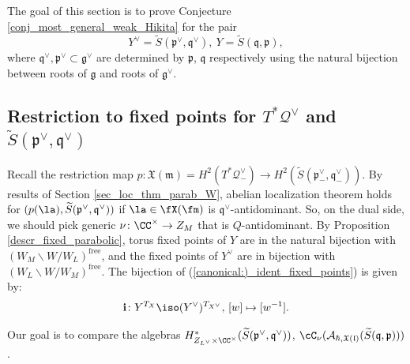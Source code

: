 \documentclass[12pt]{amsart}
\begin{document}
The goal of this section is to prove Conjecture \ref{conj_most_general_weak_Hikita} for the pair 
\begin{equation*}
Y^\vee=\widetilde{S}(\mathfrak{p}^\vee,\mathfrak{q}^\vee),~Y=\widetilde{S}(\mathfrak{q},\mathfrak{p}),
\end{equation*}
where $\mathfrak{q}^\vee, \mathfrak{p}^\vee \subset \mathfrak{g}^\vee$ are determined by $\mathfrak{p}$, $\mathfrak{q}$ respectively using the natural bijection between roots of $\mathfrak{g}$ and roots of $\mathfrak{g}^\vee$.


\subsection{Restriction to fixed points  for $T^*\mathcal{Q}^\vee$ and $\widetilde{S}(\mathfrak{p}^{\vee},\mathfrak{q}^\vee)$}
Recall the restriction map $p\colon \mathfrak{X}(\mathfrak{m})=H^2(T^*\mathcal{Q}_-^\vee) \rightarrow H^2(\widetilde{S}(\mathfrak{p}_-^\vee,\mathfrak{q}_-^\vee))$.
By results of Section \ref{sec_loc_thm_parab_W}, abelian localization theorem holds for $(p(\la),\widetilde{S}(\mathfrak{p}^\vee,\mathfrak{q}^\vee))$ if $\la\in \fX(\fm)$ is $\mathfrak{q}^\vee$-antidominant.
So, on the dual side, we should pick generic $\nu\colon \CC^\times \rightarrow Z_M$ that is $Q$-antidominant.  By Proposition \ref{descr_fixed_parabolic}, torus fixed points of $Y$ are in the natural bijection with $(W_M\backslash W/W_L)^{\mathrm{free}}$, and the fixed points of $Y^\vee$ are in bijection with $(W_L\backslash W/W_M)^{\mathrm{free}}$. The bijection of (\ref{canonical:)_ident_fixed_points}) is given by: \begin{equation*}
{\bf{i}}\colon Y^{T_X} \iso (Y^\vee)^{T_{X^\vee}},\, [w] \mapsto [w^{-1}].
\end{equation*}

Our goal is to compare the algebras $H^*_{Z_{L^\vee} \times \CC^\times}(\widetilde{S}(\mathfrak{p}^\vee,\mathfrak{q}^\vee))$, $\cC_{\nu}(\mathcal{A}_{\hbar,\mathfrak{X}(\mathfrak{l})}(\widetilde{S}(\mathfrak{q},\mathfrak{p})))$.
\end{document}
